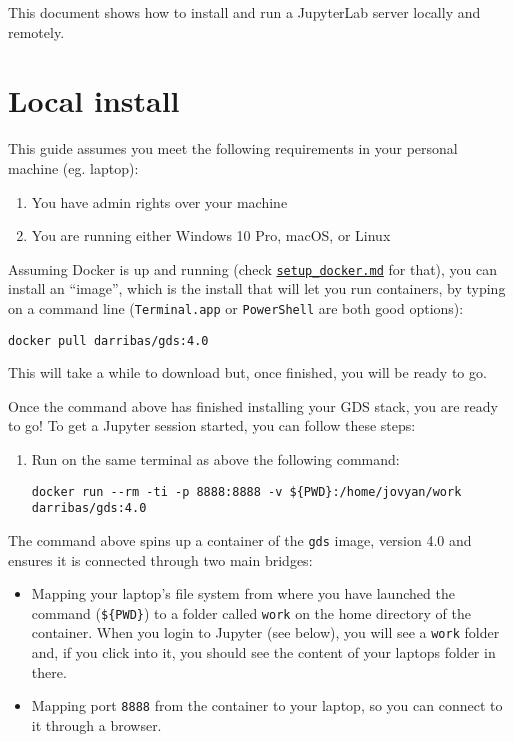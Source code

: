 \documentclass[
]{book}
\providecommand{\tightlist}{%
  \setlength{\itemsep}{0pt}\setlength{\parskip}{0pt}}
\begin{document}
This document shows how to install and run a JupyterLab server locally and
remotely.

\hypertarget{local-install}{%
\section{Local install}\label{local-install}}

This guide assumes you meet the following requirements in your personal
machine (eg. laptop):

\begin{enumerate}
\def\labelenumi{\arabic{enumi}.}
\tightlist
\item
  You have admin rights over your machine
\item
  You are running either Windows 10 Pro, macOS, or Linux
\end{enumerate}

Assuming Docker is up and running (check \href{setup_docker.md}{\texttt{setup\_docker.md}}
for that), you can install an ``image'', which is the install that will let you
run containers, by typing on a command line (\texttt{Terminal.app} or \texttt{PowerShell}
are both good options):

\begin{verbatim}
docker pull darribas/gds:4.0
\end{verbatim}

This will take a while to download but, once finished, you will be ready
to go.

Once the command above has finished installing your GDS stack, you are ready to go! To get a Jupyter session started, you can follow these steps:

\begin{enumerate}
\def\labelenumi{\arabic{enumi}.}
\item
  Run on the same terminal as above the following command:

\begin{verbatim}
docker run --rm -ti -p 8888:8888 -v ${PWD}:/home/jovyan/work darribas/gds:4.0
\end{verbatim}
\end{enumerate}

The command above spins up a container of the \texttt{gds} image, version 4.0 and
ensures it is connected through two main bridges:

\begin{itemize}
\tightlist
\item
  Mapping your laptop's file system from where you have launched the
  command (\texttt{\$\{PWD\}}) to a folder called \texttt{work} on the home directory of
  the container. When you login to Jupyter (see below), you will see a
  \texttt{work} folder and, if you click into it, you should see the content of
  your laptops folder in there.
\item
  Mapping port \texttt{8888} from the container to your laptop, so you can
  connect to it through a browser.
\end{itemize}
\end{document}
